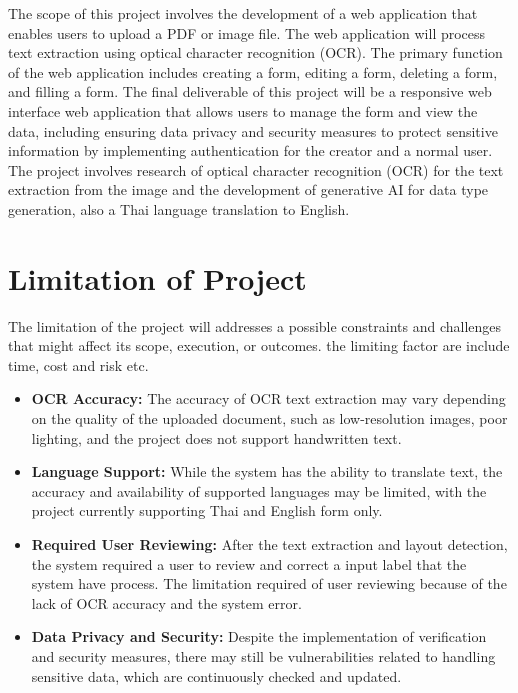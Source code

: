 \documentclass[12pt,oneside,openright,a4paper]{cpe-english-project}
\begin{document}
The scope of this project involves the development of a web application that enables users to upload a PDF or image file. The web application will process text extraction using optical character recognition (OCR). The primary function of the web application includes creating a form, editing a form, deleting a form, and filling a form. The final deliverable of this project will be a responsive web interface web application that allows users to manage the form and view the data, including ensuring data privacy and security measures to protect sensitive information by implementing authentication for the creator and a normal user. The project involves research of optical character recognition (OCR) for the text extraction from the image and the development of generative AI for data type generation, also a Thai language translation to English.

\section{Limitation of Project}
The limitation of the project will addresses a possible constraints and challenges that might affect its scope, execution, or outcomes. the limiting factor are include time, cost and risk etc.

\begin{itemize}
 \item \textbf{OCR Accuracy:} The accuracy of OCR text extraction may vary depending on the quality of the uploaded document, such as low-resolution images, poor lighting, and the project does not support handwritten text.
 
    \item \textbf{Language Support:} While the system has the ability to translate text, the accuracy and availability of supported languages may be limited, with the project currently supporting Thai and English form only.
    
    \item \textbf{Required User Reviewing:} After the text extraction and layout detection, the system required a user to review and correct a input label that the system have process. The limitation required of user reviewing because of the lack of OCR accuracy and the system error.
      
    \item \textbf{Data Privacy and Security:} Despite the implementation of verification and security measures, there may still be vulnerabilities related to handling sensitive data, which are continuously checked and updated.
\end{itemize}
\end{document}
